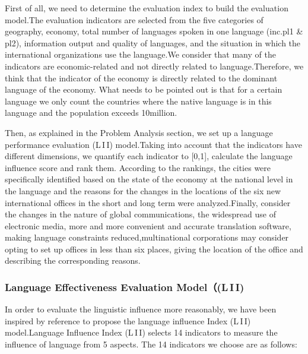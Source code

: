 \par First of all, we need to determine the evaluation index to build the evaluation model.The evaluation indicators are selected from the five categories of geography, economy, total number of languages spoken in one language (inc.pl1 \& pl2), information output and quality of languages, and the situation in which the international organizations use the language.We consider that many of the indicators are economic-related and not directly related to language.Therefore, we think that the indicator of the economy is directly related to the dominant language of the economy. What needs to be pointed out is that for a certain language we only count the countries where the native language is in this language and the population exceeds 10million.
\par Then, as explained in the Problem Analysis section, we set up a language performance evaluation (L\,I\,I) model.Taking into account that the indicators have different dimensions, we quantify each indicator to [0,1], calculate the language influence score and rank them. According to the rankings, the cities were specifically identified based on the state of the economy at the national level in the language and the reasons for the changes in the locations of the six new international offices in the short and long term were analyzed.Finally, consider the changes in the nature of global communications, the widespread use of electronic media, more and more convenient and accurate translation software, making language constraints reduced,multinational corporations may consider opting to set up offices in less than six places, giving the location of the office and describing the corresponding reasons.

\subsubsection{Language Effectiveness Evaluation Model（(L\,I\,I) } 

\noindent In order to evaluate the linguistic influence more reasonably, we have been inspired by reference to propose the language influence Index (L\,I\,I) model.Language Influence Index (L\,I\,I) selects 14 indicators to measure the influence of language from 5 aspects. The 14 indicators we choose are as follows:

